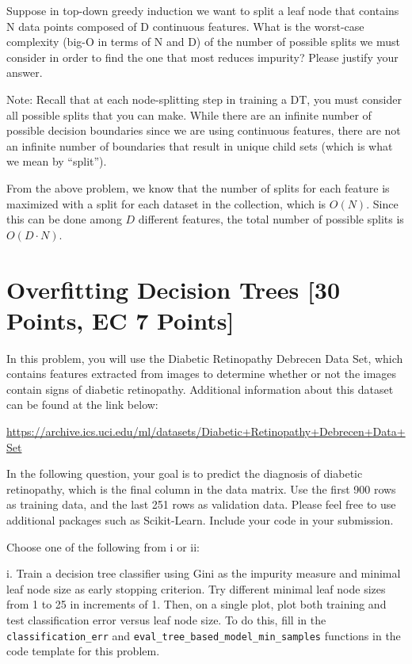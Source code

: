 \newpage

\problem[4] Suppose in top-down greedy induction we want to split a leaf node that contains N data points composed of
D continuous features. What is the worst-case
complexity (big-O in terms of N and D) of the number of possible splits we must consider in order to find the one that most reduces impurity? Please justify your answer.

Note: Recall that at each node-splitting step in training a DT, you must consider all possible splits that you can make. While there are an infinite number of possible decision boundaries since we are using continuous features, there are not an infinite number of boundaries that result in unique child sets (which is what we mean by ``split'').

\begin{solution}
   From the above problem, we know that the number of splits for each feature is maximized with a split for each dataset in the collection, which is $O(N)$. Since this can be done among $D$ different features, the total number of possible splits is $O(D \cdot N)$.
\end{solution}


\newpage


\section{Overfitting Decision Trees [30 Points, EC 7 Points]}

In this problem, you will use the Diabetic Retinopathy Debrecen Data Set, which contains features extracted from images to determine whether or not the images contain signs of diabetic retinopathy. Additional information about this dataset can be found at the link below:

\url{https://archive.ics.uci.edu/ml/datasets/Diabetic+Retinopathy+Debrecen+Data+Set}

In the following question, your goal is to predict the diagnosis of diabetic retinopathy, which is the final column in the data matrix.  Use the first 900 rows as training data, and the last
251 rows as validation data. Please feel free to use additional packages such as Scikit-Learn. Include your code in your submission.

\newpage

\problem[10] \smallskip 
Choose one of the following from i or ii: 

\noindent i. Train a decision tree classifier using Gini as the impurity measure and minimal leaf node size as early stopping criterion. Try different minimal leaf node sizes from 1 to 25 in increments of 1. Then, on a single plot, plot both training and test classification error versus leaf node size. To do this, fill in the \texttt{classification_err} and \texttt{eval_tree_based_model_min_samples} functions in the code template for this problem.



